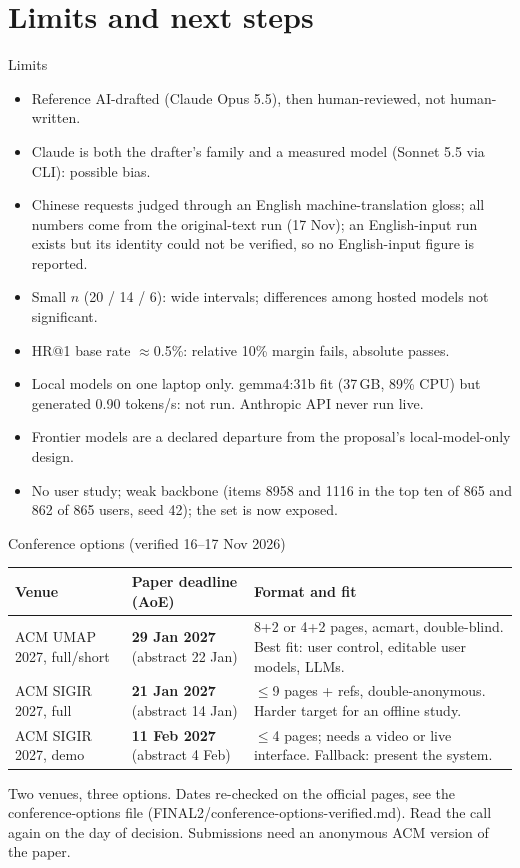 \documentclass[10pt]{beamer}
\newcommand{\toprule}{\hline}
\newcommand{\midrule}{\hline}
\newcommand{\bottomrule}{\hline}
\newcommand{\src}[1]{\vfill{\tiny\color{bcitgray}#1}}
\begin{document}
\section{Limits and next steps}
\begin{frame}{Limits}
\small
\begin{itemize}
\item Reference AI-drafted (Claude Opus 5.5), then human-reviewed, not human-written.
\item Claude is both the drafter's family and a measured model (Sonnet 5.5 via CLI): possible bias.
\item Chinese requests judged through an English machine-translation gloss; all numbers come from the original-text run (17 Nov); an English-input run exists but its identity could not be verified, so no English-input figure is reported.
\item Small $n$ (20 / 14 / 6): wide intervals; differences among hosted models not significant.
\item HR@1 base rate $\approx$0.5\%: relative 10\% margin fails, absolute passes.
\item Local models on one laptop only. gemma4:31b fit (37\,GB, 89\% CPU) but generated 0.90 tokens/s: not run. Anthropic API never run live.
\item Frontier models are a declared departure from the proposal's local-model-only design.
\item No user study; weak backbone (items 8958 and 1116 in the top ten of 865 and 862 of 865 users, seed 42); the set is now exposed.
\end{itemize}
\end{frame}

\begin{frame}{Conference options (verified 16--17 Nov 2026)}
\small
\begin{tabular}{@{}P{3.0cm}P{2.6cm}P{4.4cm}@{}}
\toprule
Venue & Paper deadline (AoE) & Format and fit\\\midrule
ACM UMAP 2027, full/short & \textbf{29 Jan 2027} (abstract 22 Jan) & 8+2 or 4+2 pages, acmart, double-blind. Best fit: user control, editable user models, LLMs.\\[0.12cm]
ACM SIGIR 2027, full & \textbf{21 Jan 2027} (abstract 14 Jan) & $\leq$9 pages + refs, double-anonymous. Harder target for an offline study.\\[0.12cm]
ACM SIGIR 2027, demo & \textbf{11 Feb 2027} (abstract 4 Feb) & $\leq$4 pages; needs a video or live interface. Fallback: present the system.\\\bottomrule
\end{tabular}\par
\src{Two venues, three options. Dates re-checked on the official pages, see the conference-options file (FINAL2/conference-options-verified.md). Read the call again on the day of decision. Submissions need an anonymous ACM version of the paper.}
\end{frame}
\end{document}
